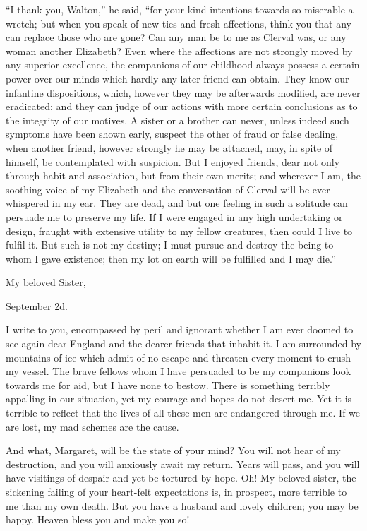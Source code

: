 \documentclass[12pt,openright]{book}
\begin{document}
“I thank you, Walton,” he said, “for your kind intentions towards so miserable a wretch; but when you speak of new ties and fresh affections, think you that any can replace those who are gone? Can any man be to me as Clerval was, or any woman another Elizabeth? Even where the affections are not strongly moved by any superior excellence, the companions of our childhood always possess a certain power over our minds which hardly any later friend can obtain. They know our infantine dispositions, which, however they may be afterwards modified, are never eradicated; and they can judge of our actions with more certain conclusions as to the integrity of our motives. A sister or a brother can never, unless indeed such symptoms have been shown early, suspect the other of fraud or false dealing, when another friend, however strongly he may be attached, may, in spite of himself, be contemplated with suspicion. But I enjoyed friends, dear not only through habit and association, but from their own merits; and wherever I am, the soothing voice of my Elizabeth and the conversation of Clerval will be ever whispered in my ear. They are dead, and but one feeling in such a solitude can persuade me to preserve my life. If I were engaged in any high undertaking or design, fraught with extensive utility to my fellow creatures, then could I live to fulfil it. But such is not my destiny; I must pursue and destroy the being to whom I gave existence; then my lot on earth will be fulfilled and I may die.”

My beloved Sister,

September 2d.

I write to you, encompassed by peril and ignorant whether I am ever doomed to see again dear England and the dearer friends that inhabit it. I am surrounded by mountains of ice which admit of no escape and threaten every moment to crush my vessel. The brave fellows whom I have persuaded to be my companions look towards me for aid, but I have none to bestow. There is something terribly appalling in our situation, yet my courage and hopes do not desert me. Yet it is terrible to reflect that the lives of all these men are endangered through me. If we are lost, my mad schemes are the cause.

And what, Margaret, will be the state of your mind? You will not hear of my destruction, and you will anxiously await my return. Years will pass, and you will have visitings of despair and yet be tortured by hope. Oh! My beloved sister, the sickening failing of your heart-felt expectations is, in prospect, more terrible to me than my own death. But you have a husband and lovely children; you may be happy. Heaven bless you and make you so!
\end{document}
